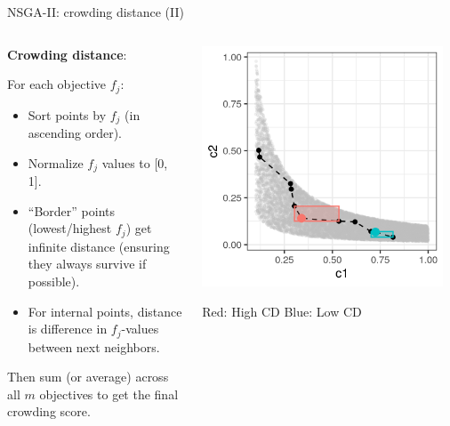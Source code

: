 \documentclass[11pt,compress,t,notes=noshow,xcolor=table]{beamer}
\begin{document}
\begin{vbframe}{NSGA-II: crowding distance (II)}

\begin{columns}
\begin{column}{0.55\textwidth}
\textbf{Crowding distance}:

For each objective $f_j$:
\begin{itemize}
\item Sort points by $f_j$ (in ascending order).
\item Normalize $f_j$ values to [0, 1].
\item “Border” points (lowest/highest $f_j$) get infinite distance (ensuring they always survive if possible).
\item For internal points, distance is difference in $f_j$-values between next neighbors.
\end{itemize}
Then sum (or average) across all $m$ objectives to get the final crowding score.
\end{column}

\begin{column}{0.45\textwidth}
\begin{center}
\includegraphics[width=0.95\textwidth]{slides/11-multicrit/figure_man/NSGA2_CS2.png}
\medskip

\begin{footnotesize}
Red: High CD \quad Blue: Low CD
\end{footnotesize}
\end{center}
\end{column}
\end{columns}

\end{vbframe}
\end{document}
